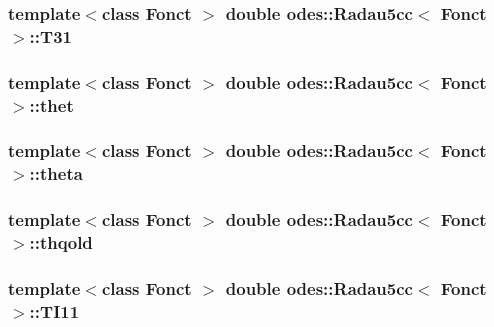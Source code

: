 \hypertarget{classodes_1_1Radau5cc_ab80295b9270d7ac0dde3e7d36dcff866}{
\subsubsection[{T31}]{\setlength{\rightskip}{0pt plus 5cm}template$<$class Fonct $>$ double {\bf odes\-::\-Radau5cc}$<$ Fonct $>$\-::T31\hspace{0.3cm}{\ttfamily [private]}}}\label{classodes_1_1Radau5cc_ab80295b9270d7ac0dde3e7d36dcff866}
\hypertarget{classodes_1_1Radau5cc_a340c376fb3c4521c3c8e95a7b9911792}{
\subsubsection[{thet}]{\setlength{\rightskip}{0pt plus 5cm}template$<$class Fonct $>$ double {\bf odes\-::\-Radau5cc}$<$ Fonct $>$\-::thet\hspace{0.3cm}{\ttfamily [private]}}}\label{classodes_1_1Radau5cc_a340c376fb3c4521c3c8e95a7b9911792}
\hypertarget{classodes_1_1Radau5cc_af9475ed436133a308c22edfda6892988}{
\subsubsection[{theta}]{\setlength{\rightskip}{0pt plus 5cm}template$<$class Fonct $>$ double {\bf odes\-::\-Radau5cc}$<$ Fonct $>$\-::theta\hspace{0.3cm}{\ttfamily [private]}}}\label{classodes_1_1Radau5cc_af9475ed436133a308c22edfda6892988}
\hypertarget{classodes_1_1Radau5cc_adda256e4a50fe0b527b9a389ba06a9c4}{
\subsubsection[{thqold}]{\setlength{\rightskip}{0pt plus 5cm}template$<$class Fonct $>$ double {\bf odes\-::\-Radau5cc}$<$ Fonct $>$\-::thqold\hspace{0.3cm}{\ttfamily [private]}}}\label{classodes_1_1Radau5cc_adda256e4a50fe0b527b9a389ba06a9c4}
\hypertarget{classodes_1_1Radau5cc_a50cc7d8eee62bccf6069a4c1f43d019b}{
\subsubsection[{T\-I11}]{\setlength{\rightskip}{0pt plus 5cm}template$<$class Fonct $>$ double {\bf odes\-::\-Radau5cc}$<$ Fonct $>$\-::T\-I11\hspace{0.3cm}{\ttfamily [private]}}}\label{classodes_1_1Radau5cc_a50cc7d8eee62bccf6069a4c1f43d019b}
